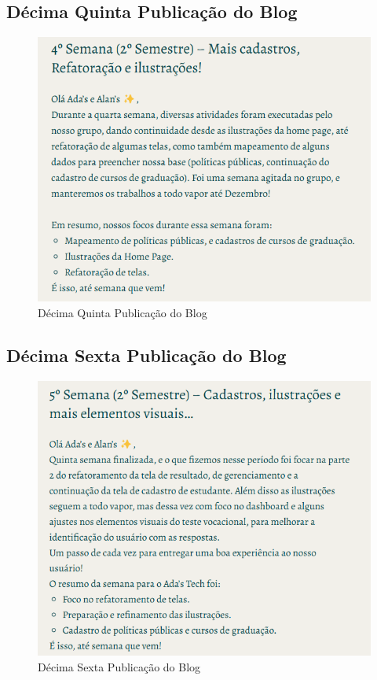 \begin{apendicesenv}
\subsection*{Décima Quinta Publicação do Blog}
\begin{figure}[H]
    \centering
    \includegraphics[width=1.0\linewidth]{images/post15.png}
    \caption{Décima Quinta Publicação do Blog}
    \label{fig:decima primeira}
\end{figure}

\subsection*{Décima Sexta Publicação do Blog}
\begin{figure}[H]
    \centering
    \includegraphics[width=1.0\linewidth]{images/post16.png}
    \caption{Décima Sexta Publicação do Blog}
    \label{fig:decima primeira}
\end{figure}


\end{apendicesenv}
